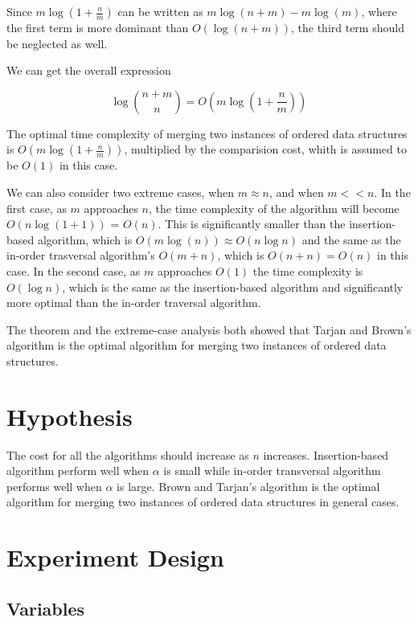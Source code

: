 \documentclass[12pt]{article}
\begin{document}
Since $m\log (1+\frac{n}{m})$ can be written as $m\log(n+m) - m\log(m)$, where the first term is more dominant than $O(\log (n+m))$, the third term should be neglected as well.

We can get the overall expression

\begin{equation}
    \boxed{\log \binom{n+m}{n} = O(m\log(1+\frac{n}{m}))}
\end{equation}

\begin{tcolorbox}[title = Theorem]
    The optimal time complexity of merging two instances of ordered data structures is $O(m\log(1+\frac{n}{m}))$, multiplied by the comparision cost, whith is assumed to be $O(1)$ in this case.
\end{tcolorbox}

We can also consider two extreme cases, when $m \approx n$, and when $m << n$. In the first case, as $m$ approaches $n$, the time complexity of the algorithm will become $O(n\log(1+1))$ = $O(n)$. This is significantly smaller than the insertion-based algorithm, which is $O(m\log(n))\approx O(n\log n)$ and the same as the in-order trasversal algorithm's $O(m+n)$, which is $O(n+n) = O(n)$ in this case. In the second case, as $m$ approaches $O(1)$ the time complexity is $O(\log n)$, which is the same as the insertion-based algorithm and significantly more optimal than the in-order traversal algorithm.

The theorem and the extreme-case analysis both showed that Tarjan and Brown's algorithm is the optimal algorithm for merging two instances of ordered data structures.

\section{Hypothesis}

The cost for all the algorithms should increase as $n$ increases. Insertion-based algorithm perform well when $\alpha$ is small while in-order transversal algorithm performs well when $\alpha$ is large. Brown and Tarjan's algorithm is the optimal algorithm for merging two instances of ordered data structures in general cases.

\section{Experiment Design}

\subsection{Variables}
\end{document}
